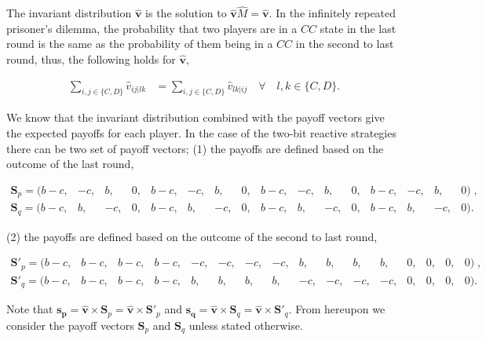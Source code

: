 \documentclass{article}
\theoremstyle{definition}
\begin{document}
The invariant distribution \(\mathbf{\hat{v}}\) is the solution to
\(\mathbf{\hat{v}} \hat{M} = \mathbf{\hat{v}}\). In the infinitely
repeated prisoner's dilemma, the probability that two players are in a \(CC\)
state in the last round is the same as the probability of them being in a \(CC\)
in the second to last round, thus, the following holds for
\(\mathbf{\hat{v}}\),

\begin{align}\label{eq:last_rounds_equality}
  \sum_{i, j \in \{C, D\}} \hat{v}_{i j | l k} & = \sum_{i, j \in \{C, D\}} \hat{v}_{l k | ij} \quad \forall \quad l, k \in \{C, D\}.
\end{align}

We know that the invariant distribution combined with the payoff vectors give
the expected payoffs for each player. In the case of the two-bit reactive
strategies there can be two set of payoff vectors; (1) the payoffs are
defined based on the outcome of the last round,

\begin{equation}\label{eq:last_round_two_bits}
  \begin{array}{*{16}{c}}
    \mathbf{S}_{p} = ( b - c , & -c , & b , & 0 , & b - c , & -c , & b , & 0 , & b - c , & -c , & b , & 0 , & b - c , & -c , & b , & 0)  \;, \\
    \mathbf{S}_{q} = ( b - c, & b, & -c, & 0, & b - c, & b, & -c, & 0, & b - c, & b, & -c, & 0, & b - c, & b, & -c, & 0).
  \end{array}
\end{equation}

(2) the payoffs are defined based on the outcome of the second to last round,

\begin{equation}\label{eq:second_to_last_round_two_bits}
  \begin{array}{*{16}{c}}
    \mathbf{S}'_{p} = (b - c, & b - c, & b - c, & b - c, & -c, & -c, & -c, & -c, & b, & b, & b, & b, & 0, & 0, & 0, & 0)  \;, \\
    \mathbf{S}'_{q} = (b - c, & b - c, & b - c, & b - c, & b, & b, & b, & b, & -c, & -c, & -c, & -c, & 0, & 0, & 0, & 0).
  \end{array}
\end{equation}

Note that \(\mathbf{s_{p}} = \mathbf{\hat{v}} \times \mathbf{S}_{p} =
\mathbf{\hat{v}} \times \mathbf{S}'_{p}\) and \(\mathbf{s_{q}} =\mathbf{\hat{v}}
\times \mathbf{S}_{q} = \mathbf{\hat{v}} \times \mathbf{S}'_{q}\). From
hereupon we consider the payoff vectors \(\mathbf{S}_{p}\) and
\(\mathbf{S}_{q}\) unless stated otherwise.
\end{document}
